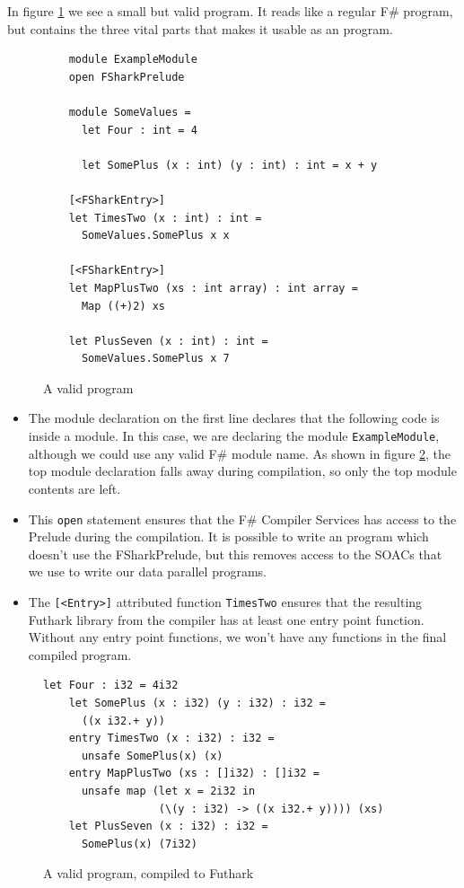 In figure \ref{fig:validfsharkprogram} we see a small but valid \fshark{} program. It
reads like a regular F\# program, but contains the three vital parts that makes
it usable as an \fshark{} program.

\begin{figure}[h]
  \centering
  \begin{verbatim}
    module ExampleModule
    open FSharkPrelude

    module SomeValues =
      let Four : int = 4

      let SomePlus (x : int) (y : int) : int = x + y

    [<FSharkEntry>]
    let TimesTwo (x : int) : int =
      SomeValues.SomePlus x x
  
    [<FSharkEntry>]
    let MapPlusTwo (xs : int array) : int array =
      Map ((+)2) xs

    let PlusSeven (x : int) : int =
      SomeValues.SomePlus x 7
  \end{verbatim}
  \caption{A valid \fshark{} program}
  \label{fig:validfsharkprogram}
\end{figure}

\begin{itemize}
\item The module declaration on the first line declares that the following code
  is inside a module. In this case, we are declaring the module
  \texttt{ExampleModule}, although we could use any valid F\# module name.
  As shown in figure \ref{fig:validfsharkprogramresult}, the top module
  declaration falls away during compilation, so only the top module contents are
  left.

\item This \texttt{open} statement ensures that the F\# Compiler Services has
  access to the \fshark{}Prelude during the compilation. It is possible to write an
  \fshark{} program which doesn't use the FSharkPrelude, but this removes access to
  the SOACs that we use to write our data parallel programs.

\item The \texttt{[<\fshark{}Entry>]} attributed function \texttt{TimesTwo} ensures
  that the resulting Futhark library from the \fshark{} compiler has at least one
  entry point function.
  Without any entry point functions, we won't have any functions in the final
  compiled \fshark{} program.
\end{itemize}

\begin{figure}
  \centering
\begin{lstlisting}[language=Futhark]
    let Four : i32 = 4i32
    let SomePlus (x : i32) (y : i32) : i32 =
      ((x i32.+ y))
    entry TimesTwo (x : i32) : i32 =
      unsafe SomePlus(x) (x)
    entry MapPlusTwo (xs : []i32) : []i32 =
      unsafe map (let x = 2i32 in
                  (\(y : i32) -> ((x i32.+ y)))) (xs)
    let PlusSeven (x : i32) : i32 =
      SomePlus(x) (7i32)
      \end{lstlisting}
  \caption{A valid \fshark{} program, compiled to Futhark}
  \label{fig:validfsharkprogramresult}
\end{figure}

